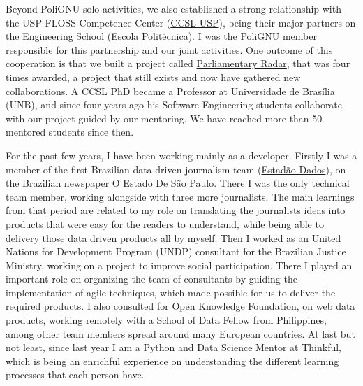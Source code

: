 \documentclass[11pt]{friggeri-cover-letter}
\begin{document}

Beyond PoliGNU solo activities, we also established a strong relationship with
the USP FLOSS Competence Center (\href{http://ccsl.ime.usp.br/en}{CCSL-USP}),
being their major partners on the Engineering School (Escola Politécnica).
%
I was the PoliGNU member responsible for this partnership and our joint
activities.
%
One outcome of this cooperation is that we built a project called
\href{http://radarparlamentar.polignu.org}{Parliamentary Radar}, that was four
times awarded, a project that still exists and now have gathered new
collaborations.
%
A CCSL PhD became a Professor at Universidade de Brasília (UNB), and since four
years ago his Software Engineering students collaborate with our project guided
by our mentoring. We have reached more than 50 mentored students since then.


For the past few years, I have been working mainly as a developer.
%
Firstly I was a member of the first Brazilian data driven journalism team
(\href{http://blog.estadaodados.com}{Estadão Dados}), on the Brazilian
newspaper O Estado De São Paulo. There I was the only technical team member,
working alongside with three more journalists. The main learnings from that
period are related to my role on translating the journalists ideas into
products that were easy for the readers to understand, while being able to
delivery those data driven products all by myself.
%
Then I worked as an United Nations for Development Program (UNDP) consultant
for the Brazilian Justice Ministry, working on a project to improve social
participation. There I played an important role on organizing the team of
consultants by guiding the implementation of agile techniques, which made
possible for us to deliver the required products.
%
I also consulted for Open Knowledge Foundation, on web data products, working
remotely with a School of Data Fellow from Philippines, among other team
members spread around many European countries.
%
At last but not least, since last year I am a Python and Data Science Mentor at
\href{https://www.thinkful.com/mentors/}{Thinkful}, which is being an enrichful
experience on understanding the different learning processes that each person
have.

\end{document}
